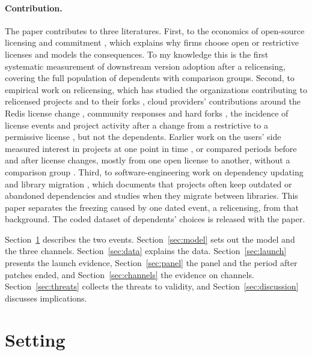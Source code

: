 \documentclass[11pt]{article}
\begin{document}
\paragraph{Contribution.} The paper contributes to three literatures. First, to the economics of open-source licensing and commitment \citep{lerner2002,lerner2005,farrell1988,august2021,casadesus2006,casadesus2011}, which explains why firms choose open or restrictive licenses and models the consequences. To my knowledge this is the first systematic measurement of downstream version adoption after a relicensing, covering the full population of dependents with comparison groups. Second, to empirical work on relicensing, which has studied the organizations contributing to relicensed projects and to their forks \citep{foster2024}, cloud providers' contributions around the Redis license change \citep{han2026}, community responses and hard forks \citep{foster2026}, the incidence of license events \citep{dmitrenko2026} and project activity after a change from a restrictive to a permissive license \citep{jahanshahi2026}, but not the dependents. Earlier work on the users' side measured interest in projects at one point in time \citep{stewart2006}, or compared periods before and after license changes, mostly from one open license to another, without a comparison group \citep{santos2017}. Third, to software-engineering work on dependency updating and library migration \citep{kula2018,he2021,miller2025}, which documents that projects often keep outdated or abandoned dependencies and studies when they migrate between libraries. This paper separates the freezing caused by one dated event, a relicensing, from that background. The coded dataset of dependents' choices is released with the paper.

Section~\ref{sec:setting} describes the two events. Section~\ref{sec:model} sets out the model and the three channels. Section~\ref{sec:data} explains the data. Section~\ref{sec:launch} presents the launch evidence, Section~\ref{sec:panel} the panel and the period after patches ended, and Section~\ref{sec:channels} the evidence on channels. Section~\ref{sec:threats} collects the threats to validity, and Section~\ref{sec:discussion} discusses implications.

\section{Setting}\label{sec:setting}
\end{document}
